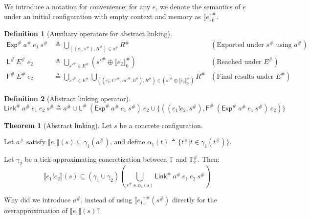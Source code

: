 \documentclass[acmsmall,screen,review]{acmart}
\theoremstyle{definition}
\newtheorem{definition}{Definition}[section]
\newtheorem{thm}{Theorem}[section]
\newcommand*{\A}[1]{{#1}^{\#}}
\newcommand*{\Time}{\mathbb{T}}
\newcommand*{\ATime}{\A{\Time}}
\newcommand*{\link}[2]{{#1}\mathtt{!}{#2}}
\newcommand*{\EE}{\mathsf{Exp}}
\newcommand*{\LL}{\mathsf{L}}
\newcommand*{\Link}{\mathsf{Link}}
\newcommand*{\sembracket}[1]{\lBrack{#1}\rBrack}
\begin{document}
We introduce a notation for convenience: for any $e$, we denote the semantics of $e$ under an initial configuration with empty context and memory as $\A{\sembracket{e}}_0$.

\begin{definition}[Auxiliary operators for abstract linking]
  \begin{align*}
    \A\EE\:\A{a}\:e_1\:\A{s}   & \triangleq\bigcup_{((e_1,\A{s}),\A{R})\in\A{a}}\A{R}                                                                         & (\text{Exported under }\A{s}\text{ using }\A{a}) \\
    \A\LL\:\A{E}\:e_2          & \triangleq\bigcup_{\A{s'}\in \A{E}}(\A{s'}\oplus\A{\sembracket{e_2}}_0)                                                      & (\text{Reached under }\A{E})                     \\
    \A{\mathsf{F}}\:\A{E}\:e_2 & \triangleq\bigcup_{\A{s'}\in \A{E}}\bigcup_{((e_2,\A{C'},\A{m'},\A{0}),\A{R})\in(\A{s'}\oplus\A{\sembracket{e_2}}_0)}{\A{R}} & (\text{Final results under }\A{E})
  \end{align*}
\end{definition}

\begin{definition}[Abstract linking operator]
  \[
    \A\Link\:\A{a}\:e_1\:e_2\:\A{s}\triangleq\A{a}\cup\A\LL\:(\A\EE\:\A{a}\:e_1\:\A{s})\:e_2\cup\{((\link{e_1}{e_2},\A{s}),\A{\mathsf{F}}\:(\A\EE\:\A{a}\:e_1\:\A{s})\:e_2)\}
  \]
\end{definition}

\begin{thm}[Abstract linking]
  Let $s$ be a concrete configuration.

  Let $\A{a}$ satisfy $\sembracket{e_1}(s)\subseteq\gamma_1(\A{a})$, and define $\alpha_1(t)\triangleq\{\A{t}|t\in\gamma_1(\A{t})\}$.

  Let $\gamma_2$ be a tick-approximating concretization between $\Time$ and $\ATime_2$. Then:
  \[
    \sembracket{\link{e_1}{e_2}}(s)\subseteq(\gamma_1\cup\gamma_2)\left(\bigcup_{\A{s}\in\alpha_1(s)}{\A\Link\:\A{a}\:e_1\:e_2\:\A{s}}\right)
  \]
\end{thm}

Why did we introduce $\A{a}$, instead of using $\A{\sembracket{e_1}}(\A{s})$ directly for the overapproximation of $\sembracket{e_1}(s)$?
\end{document}
